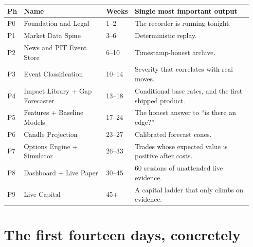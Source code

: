 \begin{longtable}{@{}p{1.0cm}p{4.0cm}p{2.0cm}p{7.4cm}@{}}
\toprule
\textbf{Ph} & \textbf{Name} & \textbf{Weeks} & \textbf{Single most important
output}\\
\midrule
P0 & Foundation and Legal & 1--2 & The recorder is running tonight.\\
P1 & Market Data Spine & 3--6 & Deterministic replay.\\
P2 & News and PIT Event Store & 6--10 & Timestamp-honest archive.\\
P3 & Event Classification & 10--14 & Severity that correlates with real moves.\\
P4 & Impact Library + Gap Forecaster & 13--18 & Conditional base rates, and the
first shipped product.\\
P5 & Features + Baseline Models & 17--24 & The honest answer to ``is there an
edge?''\\
P6 & Candle Projection & 23--27 & Calibrated forecast cones.\\
P7 & Options Engine + Simulator & 26--33 & Trades whose expected value is
positive after costs.\\
P8 & Dashboard + Live Paper & 30--45 & 60 sessions of unattended live evidence.\\
P9 & Live Capital & 45+ & A capital ladder that only climbs on evidence.\\
\bottomrule
\end{longtable}

\section{The first fourteen days, concretely}

